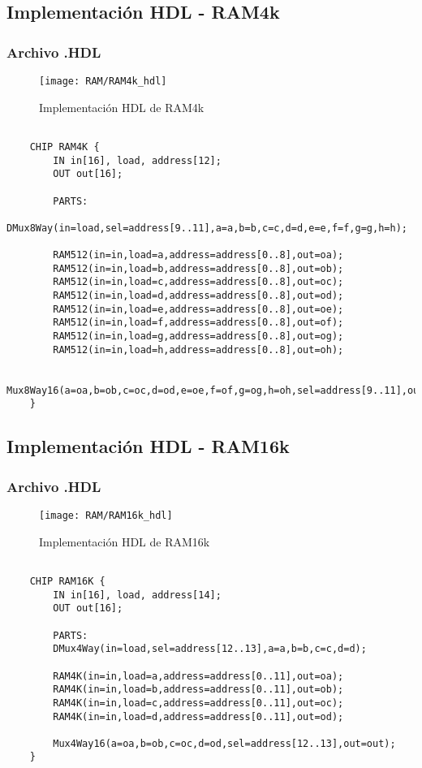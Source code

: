 \documentclass[12pt]{article}
\begin{document}
	\subsection{Implementación HDL - RAM4k}

	\subsubsection{Archivo .HDL}
	\begin{figure}[H]
	\centering
	\texttt{[image: RAM/RAM4k\_hdl]}
	\caption{Implementación HDL de RAM4k}
	\label{fig:ram4khdl}
	\end{figure}
	\begin{lstlisting}

	CHIP RAM4K {
		IN in[16], load, address[12];
		OUT out[16];

		PARTS:
		DMux8Way(in=load,sel=address[9..11],a=a,b=b,c=c,d=d,e=e,f=f,g=g,h=h);

		RAM512(in=in,load=a,address=address[0..8],out=oa);
		RAM512(in=in,load=b,address=address[0..8],out=ob);
		RAM512(in=in,load=c,address=address[0..8],out=oc);
		RAM512(in=in,load=d,address=address[0..8],out=od);
		RAM512(in=in,load=e,address=address[0..8],out=oe);
		RAM512(in=in,load=f,address=address[0..8],out=of);
		RAM512(in=in,load=g,address=address[0..8],out=og);
		RAM512(in=in,load=h,address=address[0..8],out=oh);

		Mux8Way16(a=oa,b=ob,c=oc,d=od,e=oe,f=of,g=og,h=oh,sel=address[9..11],out=out);
	}

	\end{lstlisting}

	\subsection{Implementación HDL - RAM16k}

	\subsubsection{Archivo .HDL}

	\begin{figure}[H]
	\centering
	\texttt{[image: RAM/RAM16k\_hdl]}
	\caption{Implementación HDL de RAM16k}
	\label{fig:ram16khdl}
	\end{figure}
	\begin{lstlisting}

	CHIP RAM16K {
		IN in[16], load, address[14];
		OUT out[16];

		PARTS:
		DMux4Way(in=load,sel=address[12..13],a=a,b=b,c=c,d=d);

		RAM4K(in=in,load=a,address=address[0..11],out=oa);
		RAM4K(in=in,load=b,address=address[0..11],out=ob);
		RAM4K(in=in,load=c,address=address[0..11],out=oc);
		RAM4K(in=in,load=d,address=address[0..11],out=od);

		Mux4Way16(a=oa,b=ob,c=oc,d=od,sel=address[12..13],out=out);
	}

	\end{lstlisting}
\end{document}
